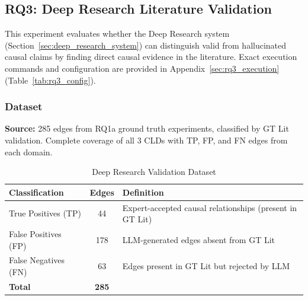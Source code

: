 \subsection{RQ3: Deep Research Literature Validation}
\label{sec:rq3_experiments}

\begin{center}
\end{center}

\vspace{0.5em}

This experiment evaluates whether the Deep Research system (Section~\ref{sec:deep_research_system}) can distinguish valid from hallucinated causal claims by finding direct causal evidence in the literature.
Exact execution commands and configuration are provided in Appendix~\ref{sec:rq3_execution} (Table~\ref{tab:rq3_config}).

\subsubsection{Dataset}

\textbf{Source:} 285 edges from RQ1a ground truth experiments, classified by GT Lit validation. Complete coverage of all 3 CLDs with TP, FP, and FN edges from each domain.

\begin{table}[H]
\centering
\caption{Deep Research Validation Dataset}
\label{tab:dr_dataset}
\footnotesize
\begin{tabular}{@{}l c l@{}}
\toprule
\textbf{Classification} & \textbf{Edges} & \textbf{Definition} \\
\midrule
True Positives (TP) & 44 & Expert-accepted causal relationships (present in GT Lit) \\
False Positives (FP) & 178 & LLM-generated edges absent from GT Lit \\
False Negatives (FN) & 63 & Edges present in GT Lit but rejected by LLM \\
\midrule
\textbf{Total} & \textbf{285} & \\
\bottomrule
\end{tabular}
\end{table}

